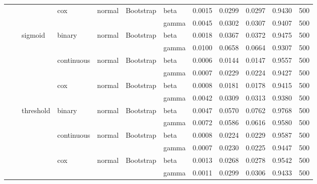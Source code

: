 \begin{tabular}{lllllllrrrrr}
\cline{4-12} \cline{5-12} \cline{6-12}
 &  &  & \multirow[t]{2}{*}{cox} & \multirow[t]{2}{*}{normal} & \multirow[t]{2}{*}{Bootstrap} & beta & 0.0015 & 0.0299 & 0.0297 & 0.9430 & 500 \\
 &  &  &  &  &  & gamma & 0.0045 & 0.0302 & 0.0307 & 0.9407 & 500 \\
\cline{3-12} \cline{4-12} \cline{5-12} \cline{6-12}
 &  & \multirow[t]{6}{*}{sigmoid} & \multirow[t]{2}{*}{binary} & \multirow[t]{2}{*}{normal} & \multirow[t]{2}{*}{Bootstrap} & beta & 0.0018 & 0.0367 & 0.0372 & 0.9475 & 500 \\
 &  &  &  &  &  & gamma & 0.0100 & 0.0658 & 0.0664 & 0.9307 & 500 \\
\cline{4-12} \cline{5-12} \cline{6-12}
 &  &  & \multirow[t]{2}{*}{continuous} & \multirow[t]{2}{*}{normal} & \multirow[t]{2}{*}{Bootstrap} & beta & 0.0006 & 0.0144 & 0.0147 & 0.9557 & 500 \\
 &  &  &  &  &  & gamma & 0.0007 & 0.0229 & 0.0224 & 0.9427 & 500 \\
\cline{4-12} \cline{5-12} \cline{6-12}
 &  &  & \multirow[t]{2}{*}{cox} & \multirow[t]{2}{*}{normal} & \multirow[t]{2}{*}{Bootstrap} & beta & 0.0008 & 0.0181 & 0.0178 & 0.9415 & 500 \\
 &  &  &  &  &  & gamma & 0.0042 & 0.0309 & 0.0313 & 0.9380 & 500 \\
\cline{3-12} \cline{4-12} \cline{5-12} \cline{6-12}
 &  & \multirow[t]{6}{*}{threshold} & \multirow[t]{2}{*}{binary} & \multirow[t]{2}{*}{normal} & \multirow[t]{2}{*}{Bootstrap} & beta & 0.0047 & 0.0570 & 0.0762 & 0.9768 & 500 \\
 &  &  &  &  &  & gamma & 0.0072 & 0.0586 & 0.0616 & 0.9580 & 500 \\
\cline{4-12} \cline{5-12} \cline{6-12}
 &  &  & \multirow[t]{2}{*}{continuous} & \multirow[t]{2}{*}{normal} & \multirow[t]{2}{*}{Bootstrap} & beta & 0.0008 & 0.0224 & 0.0229 & 0.9587 & 500 \\
 &  &  &  &  &  & gamma & 0.0007 & 0.0230 & 0.0225 & 0.9447 & 500 \\
\cline{4-12} \cline{5-12} \cline{6-12}
 &  &  & \multirow[t]{2}{*}{cox} & \multirow[t]{2}{*}{normal} & \multirow[t]{2}{*}{Bootstrap} & beta & 0.0013 & 0.0268 & 0.0278 & 0.9542 & 500 \\
 &  &  &  &  &  & gamma & 0.0011 & 0.0299 & 0.0306 & 0.9433 & 500 \\
\cline{1-12} \cline{2-12} \cline{3-12} \cline{4-12} \cline{5-12} \cline{6-12}
\bottomrule
\end{tabular}
